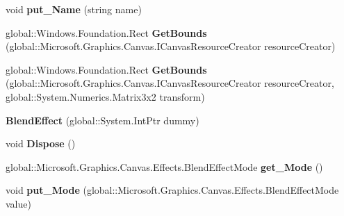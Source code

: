 \begin{DoxyCompactItemize}
void {\bfseries put\+\_\+\+Name} (string name)
\item 
\mbox{\label{class_microsoft_1_1_graphics_1_1_canvas_1_1_effects_1_1_blend_effect_a7a22f733debb5fcc64e20a7ef9d6c633}} 
global\+::\+Windows.\+Foundation.\+Rect {\bfseries Get\+Bounds} (global\+::\+Microsoft.\+Graphics.\+Canvas.\+I\+Canvas\+Resource\+Creator resource\+Creator)
\item 
\mbox{\label{class_microsoft_1_1_graphics_1_1_canvas_1_1_effects_1_1_blend_effect_aeaac7a44c02206f0c747d639ddf8c73a}} 
global\+::\+Windows.\+Foundation.\+Rect {\bfseries Get\+Bounds} (global\+::\+Microsoft.\+Graphics.\+Canvas.\+I\+Canvas\+Resource\+Creator resource\+Creator, global\+::\+System.\+Numerics.\+Matrix3x2 transform)
\item 
\mbox{\label{class_microsoft_1_1_graphics_1_1_canvas_1_1_effects_1_1_blend_effect_aacace451098126cd26608dce234e9905}} 
{\bfseries Blend\+Effect} (global\+::\+System.\+Int\+Ptr dummy)
\item 
\mbox{\label{class_microsoft_1_1_graphics_1_1_canvas_1_1_effects_1_1_blend_effect_a5d0e95366e1252da3cf90f1d61cd0935}} 
void {\bfseries Dispose} ()
\item 
\mbox{\label{class_microsoft_1_1_graphics_1_1_canvas_1_1_effects_1_1_blend_effect_ab50bbe9eaad5189343a4e0dc8958294a}} 
global\+::\+Microsoft.\+Graphics.\+Canvas.\+Effects.\+Blend\+Effect\+Mode {\bfseries get\+\_\+\+Mode} ()
\item 
\mbox{\label{class_microsoft_1_1_graphics_1_1_canvas_1_1_effects_1_1_blend_effect_ae28d797f3ec0b639d357346a4e2eb258}} 
void {\bfseries put\+\_\+\+Mode} (global\+::\+Microsoft.\+Graphics.\+Canvas.\+Effects.\+Blend\+Effect\+Mode value)
\item 
\mbox{\label{class_microsoft_1_1_graphics_1_1_canvas_1_1_effects_1_1_blend_effect_a8c5401801aebc2069ae548d01680f8a9}} 

\end{DoxyCompactItemize}
